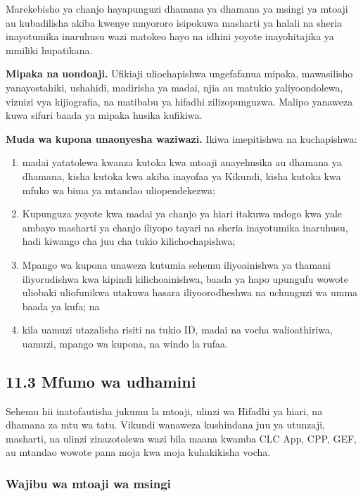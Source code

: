 \documentclass[11pt]{article}
\begin{document}
Marekebisho ya chanjo hayapunguzi dhamana ya dhamana ya msingi ya mtoaji au kubadilisha akiba kwenye mnyororo isipokuwa masharti ya halali na sheria inayotumika inaruhusu wazi matokeo hayo na idhini yoyote inayohitajika ya mmiliki hupatikana.

\textbf{Mipaka na uondoaji.} Ufikiaji uliochapishwa ungefafanua mipaka, mawasilisho yanayostahiki, ushahidi, madirisha ya madai, njia au matukio yaliyoondolewa, vizuizi vya kijiografia, na matibabu ya hifadhi zilizopunguzwa. Malipo yanaweza kuwa sifuri baada ya mipaka husika kufikiwa.

\textbf{Muda wa kupona unaonyesha waziwazi.} Ikiwa imepitishwa na kuchapishwa:

\begin{enumerate}[leftmargin=*]
\item madai yatatolewa kwanza kutoka kwa mtoaji anayehusika au dhamana ya dhamana, kisha kutoka kwa akiba inayofaa ya Kikundi, kisha kutoka kwa mfuko wa bima ya mtandao uliopendekezwa;
\item Kupunguza yoyote kwa madai ya chanjo ya hiari itakuwa mdogo kwa yale ambayo masharti ya chanjo iliyopo tayari na sheria inayotumika inaruhusu, hadi kiwango cha juu cha tukio kilichochapishwa;
\item Mpango wa kupona unaweza kutumia sehemu iliyoainishwa ya thamani iliyorudishwa kwa kipindi kilichoainishwa, baada ya hapo upungufu wowote uliobaki uliofunikwa utakuwa hasara iliyoorodheshwa na uchunguzi wa umma baada ya kufa; na
\item kila uamuzi utazalisha risiti na tukio ID, madai na vocha walioathiriwa, uamuzi, mpango wa kupona, na windo la rufaa.
\end{enumerate}
\subsection*{11.3 Mfumo wa udhamini}

Sehemu hii inatofautisha jukumu la mtoaji, ulinzi wa Hifadhi ya hiari, na dhamana za mtu wa tatu. Vikundi wanaweza kushindana juu ya utunzaji, masharti, na ulinzi zinazotolewa wazi bila maana kwamba CLC App, CPP, GEF, au mtandao wowote pana moja kwa moja kuhakikisha vocha.

\subsubsection*{Wajibu wa mtoaji wa msingi}
\end{document}
